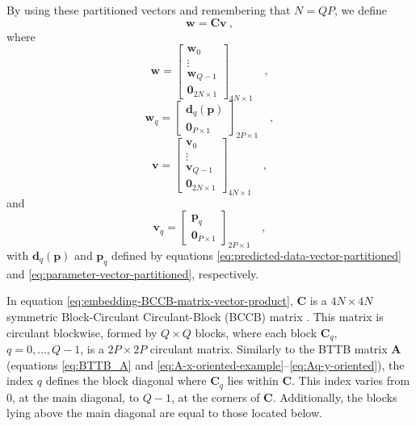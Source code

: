 \documentclass[manuscript,revised]{geophysics}
\begin{document}
By using these partitioned vectors and remembering that $N = QP$, we define 
\begin{equation}
\mathbf{w} = \mathbf{C} \mathbf{v} \: ,
\label{eq:embedding-BCCB-matrix-vector-product}
\end{equation}
where
\begin{equation}
\mathbf{w} = \begin{bmatrix}
\mathbf{w}_{0} \\
\vdots \\
\mathbf{w}_{Q - 1} \\
\mathbf{0}_{2N \times 1}
\end{bmatrix}_{4N \times 1} \quad ,
\label{eq:w-vector}
\end{equation}
\begin{equation}
\mathbf{w}_{q} = \begin{bmatrix}
\mathbf{d}_{q}(\mathbf{p}) \\
\mathbf{0}_{P \times 1}
\end{bmatrix}_{2P \times 1}
\label{eq:wq-vector} \quad ,
\end{equation}
\begin{equation}
\mathbf{v} = \begin{bmatrix}
\mathbf{v}_{0} \\
\vdots \\
\mathbf{v}_{Q - 1} \\
\mathbf{0}_{2N \times 1}
\end{bmatrix}_{4N \times 1} \quad ,
\label{eq:v-vector}
\end{equation}
and
\begin{equation}
\mathbf{v}_{q} = \begin{bmatrix}
\mathbf{p}_{q} \\
\mathbf{0}_{P \times 1}
\end{bmatrix}_{2P \times 1}
\label{eq:vq-vector} \quad ,
\end{equation}
with $\mathbf{d}_{q}(\mathbf{p})$ and $\mathbf{p}_{q}$ defined by
equations \ref{eq:predicted-data-vector-partitioned} and 
\ref{eq:parameter-vector-partitioned}, respectively.

In equation \ref{eq:embedding-BCCB-matrix-vector-product}, $\mathbf{C}$ is a 
$4N \times 4N$ symmetric Block-Circulant Circulant-Block (BCCB) matrix \citep[][ p. 184]{davis1979}.
This matrix is circulant blockwise, formed by $Q \times Q$ blocks, where
each block $\mathbf{C}_{q}$, $q = 0, \dots, Q-1$, is a $2P \times 2P$ circulant matrix. 
Similarly to the BTTB matrix $\mathbf{A}$ (equations \ref{eq:BTTB_A} and 
\ref{eq:A-x-oriented-example}--\ref{eq:Aq-y-oriented}), 
the index $q$ defines the block diagonal where $\mathbf{C}_{q}$ lies 
within $\mathbf{C}$. This index varies from $0$, at the main diagonal, to $Q - 1$, at
the corners of $\mathbf{C}$. Additionally, the blocks lying 
above the main diagonal are equal to those located below.
\end{document}

